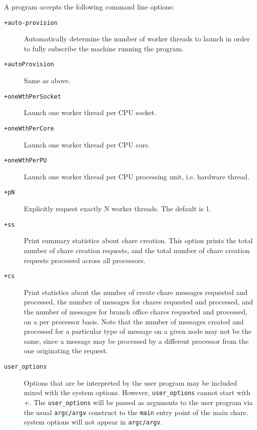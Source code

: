 A \charmpp{} program accepts the following command line options:
\begin{description}

\item[{\tt +auto-provision}] Automatically determine the number of worker
threads to launch in order to fully subscribe the machine running the program.

\item[{\tt +autoProvision}] Same as above.

\item[{\tt +oneWthPerSocket}] Launch one worker thread per CPU socket.

\item[{\tt +oneWthPerCore}] Launch one worker thread per CPU core.

\item[{\tt +oneWthPerPU}] Launch one worker thread per CPU processing unit,
i.e. hardware thread.

\item[{\tt +pN}] Explicitly request exactly N worker threads.
The default is 1.

\item[{\tt +ss}] Print summary statistics about chare creation.  This option
prints the total number of chare creation requests, and the total number of
chare creation requests processed across all processors.

\item[{\tt +cs}] Print statistics about the number of create chare messages
requested and processed, the number of messages for chares requested and
processed, and the number of messages for branch office chares requested and
processed, on a per processor basis.  Note that the number of messages
created and processed for a particular type of message on a given node
may not be the same, since a message may be processed by a different
processor from the one originating the request.

\item[{\tt user\_options}] Options that are be interpreted by the user
program may be included mixed with the system options.
However, {\tt user\_options} cannot start with +.
The {\tt user\_options} will be passed as arguments to the user program
via the usual {\tt argc/argv} construct to the {\tt main}
entry point of the main chare.
\charmpp{} system options will not appear in {\tt argc/argv}.

\end{description}




